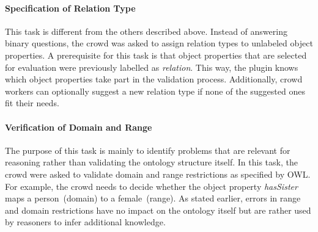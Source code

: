 \paragraph{Specification of Relation Type}
This task is different from the others described above. Instead of answering binary questions, the crowd was asked to assign relation types to unlabeled object properties. A prerequisite for this task is that object properties that are selected for evaluation were previously labelled as \emph{relation}. This way, the plugin knows which object properties take part in the validation process. Additionally, crowd workers can optionally suggest a new relation type if none of the suggested ones fit their needs. 

\paragraph{Verification of Domain and Range}
The purpose of this task is mainly to identify problems that are relevant for reasoning rather than validating the ontology structure itself. In this task, the crowd were asked to validate domain and range restrictions as specified by OWL. For example, the crowd needs to decide whether the object property \emph{hasSister} maps a person~(domain) to a female~(range). As stated earlier, errors in range and domain restrictions have no impact on the ontology itself but are rather used by reasoners to infer additional knowledge. 
